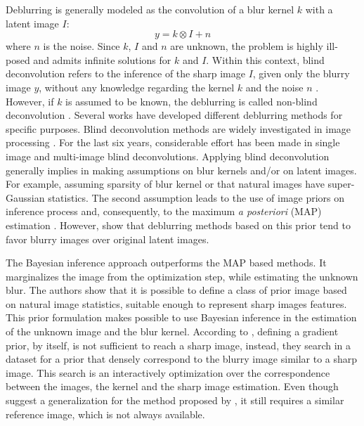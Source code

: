 \documentclass[conference]{IEEEtran}
\begin{document}
Deblurring is generally modeled as the convolution of a blur kernel $k$
with a latent image $I$: 
\begin{equation}
 y = k \otimes I + n
 \label{eq:deblurr}
\end{equation}
where $n$ is the noise. Since $k$, $I$ and $n$ are unknown, the problem 
is highly ill-posed and admits infinite solutions for $k$ and $I$.
Within this context, blind deconvolution refers to the inference of the
sharp image $I$, given only the blurry image $y$, without any knowledge
regarding the kernel $k$ and the noise $n$ \cite{Zhang2013}. However, if $k$ is assumed to be known,
the deblurring is called non-blind deconvolution \cite{Wang2009}. 
Several works have developed different deblurring methods for specific purposes.
Blind deconvolution methods are widely investigated in image processing \cite{Bishop2007}.
For the last six years, considerable effort has been made in single image
\cite{Babacan2012,Krishnan2015,Levin2011,Zhang2011} and multi-image \cite{sroubek2012,Zhu2012} blind deconvolutions. 
Applying blind deconvolution generally implies in making assumptions on
blur kernels and/or on latent images. For example, assuming sparsity of blur kernel
or that natural images have super-Gaussian statistics. The second assumption
leads to the use of image priors on inference process and, consequently, to the maximum \textit{a posteriori}
(MAP) estimation \cite{Babacan2012}. However, \cite{Levin} show that deblurring methods
based on this prior tend to favor blurry images over original latent images.

The Bayesian inference approach \cite{Levin} outperforms the MAP based methods. It marginalizes
the image from the optimization step, while estimating the unknown blur.
The authors show that it is possible to define a class of prior image
based on natural image statistics, suitable enough to represent sharp images features.
This prior formulation makes possible to use Bayesian inference in the estimation of the
unknown image and the blur kernel. According to \cite{Hacohen13}, defining a gradient
prior, by itself, is not sufficient to reach a sharp image, instead,
they search in a dataset for a prior that densely correspond to
the blurry image similar to a sharp image. This search is an
interactively optimization over the correspondence between the images, the kernel and
the sharp image estimation. Even though \cite{Pan2014} suggest a generalization
for the method proposed by \cite{Hacohen13}, it still requires a similar reference image,
which is not always available.
\end{document}
